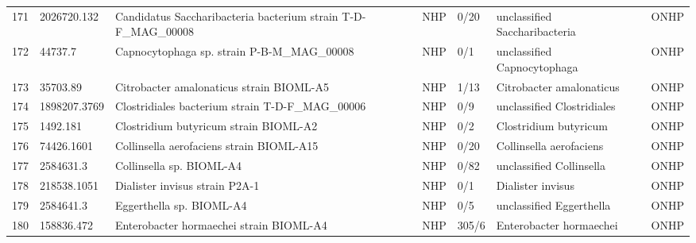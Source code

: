 \begin{longtable}{llllllll}
171 &   2026720.132 &           Candidatus Saccharibacteria bacterium strain T-D-F\_MAG\_00008 &   NHP &      0/20 &                  unclassified Saccharibacteria &                                         \cite{perez2014newly} &  ONHP \\
172 &       44737.7 &                              Capnocytophaga sp. strain P-B-M\_MAG\_00008 &   NHP &       0/1 &                    unclassified Capnocytophaga &                               \cite{jolivet2007antimicrobial} &  ONHP \\
173 &      35703.89 &                                 Citrobacter amalonaticus strain BIOML-A5 &   NHP &      1/13 &                       Citrobacter amalonaticus &                 \cite{poyet2019library,garcia2016citrobacter} &  ONHP \\
174 &  1898207.3769 &                         Clostridiales bacterium strain T-D-F\_MAG\_00006 &   NHP &       0/9 &                     unclassified Clostridiales &                                         \cite{perez2014newly} &  ONHP \\
175 &      1492.181 &                                    Clostridium butyricum strain BIOML-A2 &   NHP &       0/2 &                          Clostridium butyricum &                 \cite{poyet2019library,cassir2016clostridium} &  ONHP \\
176 &    74426.1601 &                                 Collinsella aerofaciens strain BIOML-A15 &   NHP &      0/20 &                        Collinsella aerofaciens &                \cite{poyet2019library,tourlousse2020complete} &  ONHP \\
177 &     2584631.3 &                                                 Collinsella sp. BIOML-A4 &   NHP &      0/82 &                       unclassified Collinsella &                \cite{poyet2019library,tourlousse2020complete} &  ONHP \\
178 &   218538.1051 &                                           Dialister invisus strain P2A-1 &   NHP &       0/1 &                              Dialister invisus &                                 \cite{morio2007antimicrobial} &  ONHP \\
179 &     2584641.3 &                                                 Eggerthella sp. BIOML-A4 &   NHP &       0/5 &                       unclassified Eggerthella &                  \cite{poyet2019library,gardiner2015clinical} &  ONHP \\
180 &    158836.472 &                                  Enterobacter hormaechei strain BIOML-A4 &   NHP &     305/6 &                        Enterobacter hormaechei &               \cite{poyet2019library,paauw2009identification} &  ONHP \\

\end{longtable}
